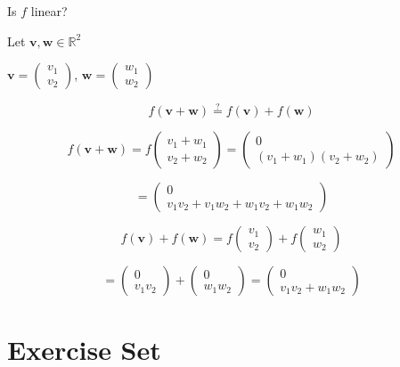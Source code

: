 Is $f$ linear?

Let $\mathbf{v}, \mathbf{w} \in \mathbb{R}^2$

$\mathbf{v} = \left( \begin{array}{c}
v_1 \\
v_2
\end{array} \right)$, $\mathbf{w} = \left( \begin{array}{c}
w_1 \\
w_2
\end{array} \right)$

\[
f(\mathbf{v} + \mathbf{w}) \stackrel{?}{=} f(\mathbf{v}) + f(\mathbf{w})
\]

\[
f(\mathbf{v} + \mathbf{w}) = f\left( \begin{array}{c}
v_1 + w_1 \\
v_2 + w_2
\end{array} \right) = \left( \begin{array}{c}
0 \\
(v_1 + w_1)(v_2 + w_2)
\end{array} \right)
\]

\[
= \left( \begin{array}{c}
0 \\
v_1v_2 + v_1w_2 + w_1v_2 + w_1w_2
\end{array} \right)
\]

\[
f(\mathbf{v}) + f(\mathbf{w}) = f\left( \begin{array}{c}
v_1 \\
v_2
\end{array} \right) + f\left( \begin{array}{c}
w_1 \\
w_2
\end{array} \right)
\]

\[
= \left( \begin{array}{c}
0 \\
v_1v_2
\end{array} \right) + \left( \begin{array}{c}
0 \\
w_1w_2
\end{array} \right) = \left( \begin{array}{c}
0 \\
v_1v_2 + w_1w_2
\end{array} \right)
\]

\section{Exercise Set}





